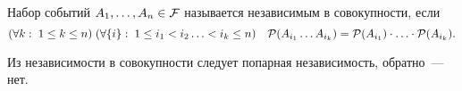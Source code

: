 \begin{definition}
Набор событий $A_1, \ldots, A_n \in \mathcal{F}$ называется независимым в совокупности, если 
\[(\forall k:\; 1 \le k \le n) \; (\forall \{i\}:\; 1 \le i_1 < i_2 \ldots < i_k \le n)\quad \mathcal{P}(A_{i_1} \ldots A_{i_k}) = \mathcal{P}(A_{i_1}) \cdot \ldots \cdot \mathcal{P} (A_{i_k}).\]
\end{definition}


Из независимости в совокупности следует попарная независимость, обратно~--- нет.

\begin{example}

\end{example}

